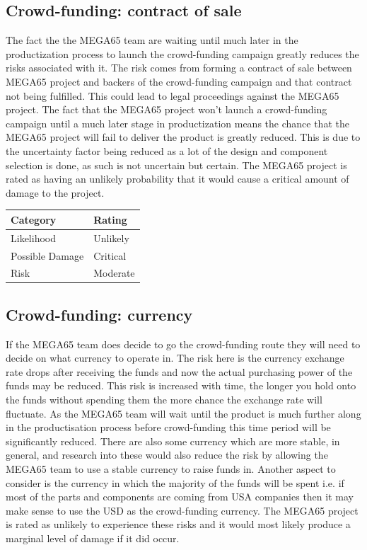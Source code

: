 \subsection{Crowd-funding: contract of sale}
The fact the the MEGA65 team are waiting until much later in the productization process to launch the crowd-funding campaign greatly reduces the risks associated with it. The risk comes from forming a contract of sale between MEGA65 project and backers of the crowd-funding campaign and that contract not being fulfilled. This could lead to legal proceedings against the MEGA65 project. The fact that the MEGA65 project won't launch a crowd-funding campaign until a much later stage in productization means the chance that the MEGA65 project will fail to deliver the product is greatly reduced. This is due to the uncertainty factor being reduced as a lot of the design and component selection is done, as such is not uncertain but certain. The MEGA65 project is rated as having an unlikely probability that it would cause a critical amount of damage to the project. \\

\begin{tabular}{l|l} %
    	\textbf{Category} 	&	\textbf{Rating} \\
      \hline
     Likelihood			&	Unlikely \\
     Possible Damage 	& 	Critical \\
     Risk 				&	Moderate		\\	
    \end{tabular}


\subsection{Crowd-funding: currency}
If the MEGA65 team does decide to go the crowd-funding route they will need to decide on what currency to operate in. The risk here is the currency exchange rate drops after receiving the funds and now the actual purchasing power of the funds may be reduced. This risk is increased with time, the longer you hold onto the funds without spending them the more chance the exchange rate will fluctuate. As the MEGA65 team will wait until the product is much further along in the productisation process before crowd-funding this time period will be significantly reduced. There are also some currency which are more stable, in general, and research into these would also reduce the risk by allowing the MEGA65 team to use a stable currency to raise funds in. Another aspect to consider is the currency in which the majority of the funds will be spent i.e. if most of the parts and components are coming from USA companies then it may make sense to use the USD as the crowd-funding currency. The MEGA65 project is rated as unlikely to experience these risks and it would most likely produce a marginal level of damage if it did occur. \\

